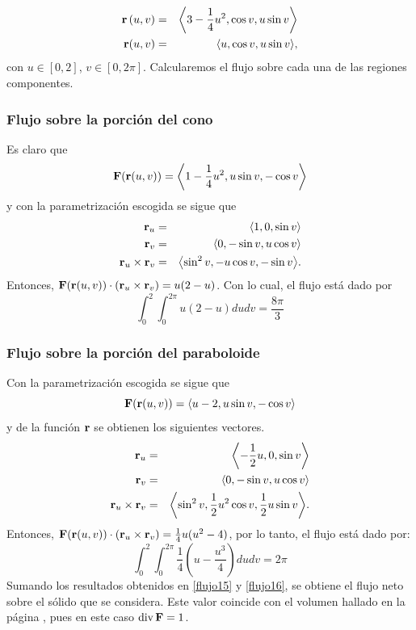 \begin{parrafonumerado}
\begin{eqnarray*}
{\bf r}\left( u,v\right) &=&\left\langle 3-\frac{1}{4}u^{2},\cos v,u\sin v\right\rangle\\
{\bf r}( u,v) &=&\left\langle u,\cos v,u\sin v\right\rangle\!,
\end{eqnarray*}
con $u\in [0,2]$, $v\in [0,2\pi ]$.
Calcularemos el flujo sobre cada una de las regiones componentes.
\subsubsection{Flujo sobre la porción del cono}

Es claro que \[{\bf F}({\bf r}(u,v))=\left\langle 1-\frac{1}{4}u^{2},u\sin v, -\cos v\right\rangle\] y con la parametrización escogida se sigue que
\begin{eqnarray*}
{\bf r}_{u}&=&\left\langle 1,0,\sin v\right\rangle \\
{\bf r}_{v}&=&\left\langle 0,-\sin v,u\cos v\right\rangle \\
{\bf r}_{u}\times {\bf r}_{v}&=& \left\langle \sin ^{2}v,-u\cos v,-\sin v\right\rangle\!.
\end{eqnarray*}
Entonces, ${\bf F}({\bf r}(u,v)) \cdot ({\bf r}_{u}\times {\bf r}_{v}) = u(2-u)$.
Con lo cual, el flujo está dado por
\begin{equation}\label{flujo15}
\int_0^2\int_0^{2\pi} u(2-u) du dv = \frac{8\pi}{3}
\end{equation}

\subsubsection{Flujo sobre la porción del paraboloide}

Con la parametrización escogida se sigue que
\[{\bf F}({\bf r}(u,v))=\left\langle u-2,u\sin v,-\cos v \right\rangle\] y de la función ${\bf r}$
se obtienen los siguientes vectores.
\begin{eqnarray*}
{\bf r}_{u}&=&\left\langle -\frac{1}{2}u,0,\sin v\right\rangle \\
{\bf r}_{v}&=&\left\langle 0,-\sin v,u\cos v\right\rangle \\
{\bf r}_{u}\times {\bf r}_{v}&=&\left\langle \sin ^{2}v,\frac{1}{2}u^{2}\cos v,\frac{1}{2}u\sin v\right\rangle\!.
\end{eqnarray*}
Entonces, ${\bf F}({\bf r}(u,v)) \cdot ({\bf r}_{u}\times {\bf r}_{v}) = \frac{1}{4}u(u^2-4)$, por lo tanto, el flujo está dado por:
\begin{equation}\label{flujo16}
\int_0^2\int_0^{2\pi}\frac{1}{4}\left (u-\frac{u^3}{4} \right ) du dv = 2\pi
\end{equation}
Sumando los resultados obtenidos en \ref{flujo15} y \ref{flujo16}, se obtiene el flujo neto sobre el sólido que se considera. Este valor coincide con el volumen hallado en la página \pageref{ejercicio10}, pues en este caso ${\rm div}\,{\bf F}=1$.


\end{parrafonumerado}
